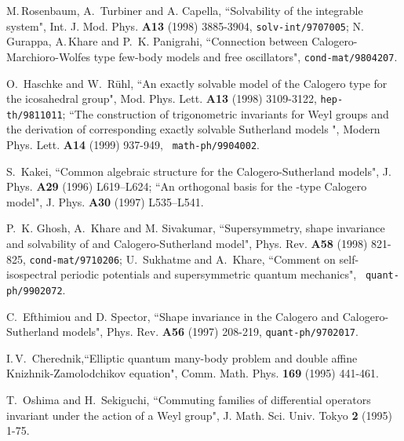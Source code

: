 \documentclass[a4paper,12pt]{article}
\begin{document}
\begin{thebibliography}{99}
M.\,Rosenbaum, A.\, Turbiner and A. Capella, ``Solvability of the \coordHE{}
integrable system", Int. J. Mod. Phys. {\bf A13} (1998) 3885-3904,
{\tt solv-int/9707005};
N. Gurappa, A.\,Khare and P.\, K. Panigrahi,
``Connection between Calogero-Marchioro-Wolfes type few-body models and
free oscillators", {\tt cond-mat/9804207}.



O.\, Haschke  and W.\, R\"uhl, ``An exactly solvable model of the
Calogero
type for the icosahedral group", Mod. Phys. Lett. {\bf A13} (1998)
3109-3122,
{\tt hep-th/9811011};
``The construction of trigonometric invariants for
Weyl groups and the derivation of corresponding exactly solvable
Sutherland
models ",  Modern Phys. Lett. {\bf A14}  (1999) 937-949, {\tt
math-ph/9904002}.

S.\, Kakei, ``Common algebraic structure for the Calogero-Sutherland
models",
J. Phys. {\bf A29} (1996) L619--L624;
``An orthogonal basis for the \coordHE{}-type Calogero model",
J. Phys. {\bf A30} (1997) L535--L541.

 P.\, K. Ghosh, A.\, Khare and M. Sivakumar, ``Supersymmetry, shape
invariance and solvability of \coordHE{} and \coordHE{}
Calogero-Sutherland
 model", Phys. Rev. {\bf A58} (1998) 821-825, {\tt cond-mat/9710206};
 U.\, Sukhatme and A.\, Khare, ``Comment on self-isospectral periodic
potentials and supersymmetric quantum mechanics", {\tt
quant-ph/9902072}.


C.\, Efthimiou and D. Spector, ``Shape invariance in the Calogero and
Calogero-Sutherland models", Phys. Rev. {\bf A56} (1997) 208-219,
{\tt quant-ph/9702017}.


I.\,V.\, Cherednik,``Elliptic quantum many-body problem
and double affine Knizhnik-Zamolodchikov equation", Comm. Math. Phys.
{\bf 169} (1995) 441-461.

T.\, Oshima and H.\, Sekiguchi, ``Commuting families of differential
operators invariant under the action of a Weyl group",
J. Math. Sci. Univ. Tokyo
{\bf 2}  (1995) 1-75.



\end{thebibliography}
\end{document}
